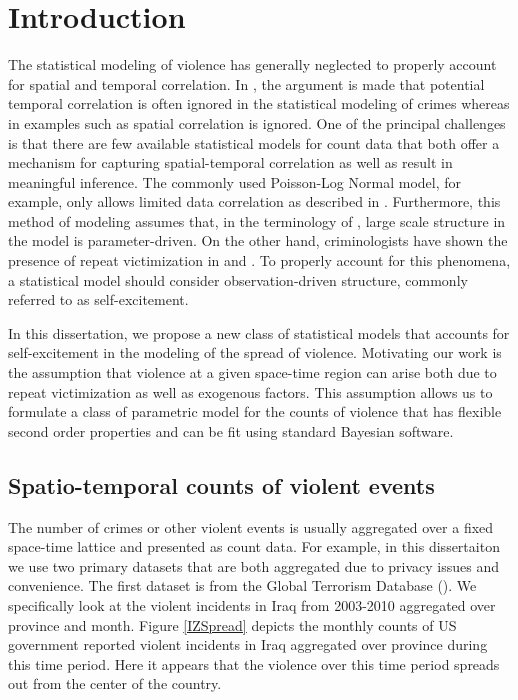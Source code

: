 \documentclass[11pt]{isuthesis}
\begin{document}
\chapter{Introduction}
The statistical modeling of violence has generally neglected to properly account for spatial and temporal correlation.  In \cite{ratcliffe2010crime}, the argument is made that potential temporal correlation is often ignored in the statistical modeling of crimes whereas in examples such as \cite{mohler2013modeling} spatial correlation is ignored.  One of the principal challenges is that there are few available statistical models for count data that both offer a mechanism for capturing spatial-temporal correlation as well as result in meaningful inference.  The commonly used Poisson-Log Normal model, for example, only allows limited data correlation as described in \cite{aitchison1989multivariate}.  Furthermore, this method of modeling assumes that, in the terminology of \cite{cox1981statistical}, large scale structure in the model is parameter-driven.  On the other hand, criminologists have shown the presence of repeat victimization in \cite{johnson1997new} and \cite{johnson2007space}.  To properly account for this phenomena, a statistical model should consider observation-driven structure, commonly referred to as self-excitement.

In this dissertation, we propose a new class of statistical models that accounts for self-excitement in the modeling of the spread of violence.  Motivating our work is the assumption that violence at a given space-time region can arise both due to repeat victimization as well as  exogenous factors.  This assumption allows us to formulate a class of parametric model for the counts of violence that has flexible second order properties and can be fit using standard Bayesian software.

\section{Spatio-temporal counts of violent events}

The number of crimes or other violent events is usually aggregated over a fixed space-time lattice and presented as count data.  For example, in this dissertaiton we use two primary datasets that are both aggregated due to privacy issues and convenience.  The first dataset is from the Global Terrorism Database (\cite{lafree2007introducing}).  We specifically look at the violent incidents in Iraq from 2003-2010 aggregated over province and month.  Figure \ref{IZSpread} depicts the monthly counts of US government reported violent incidents in Iraq aggregated over province during this time period.  Here it appears that the violence over this time period spreads out from the center of the country. 
\end{document}
